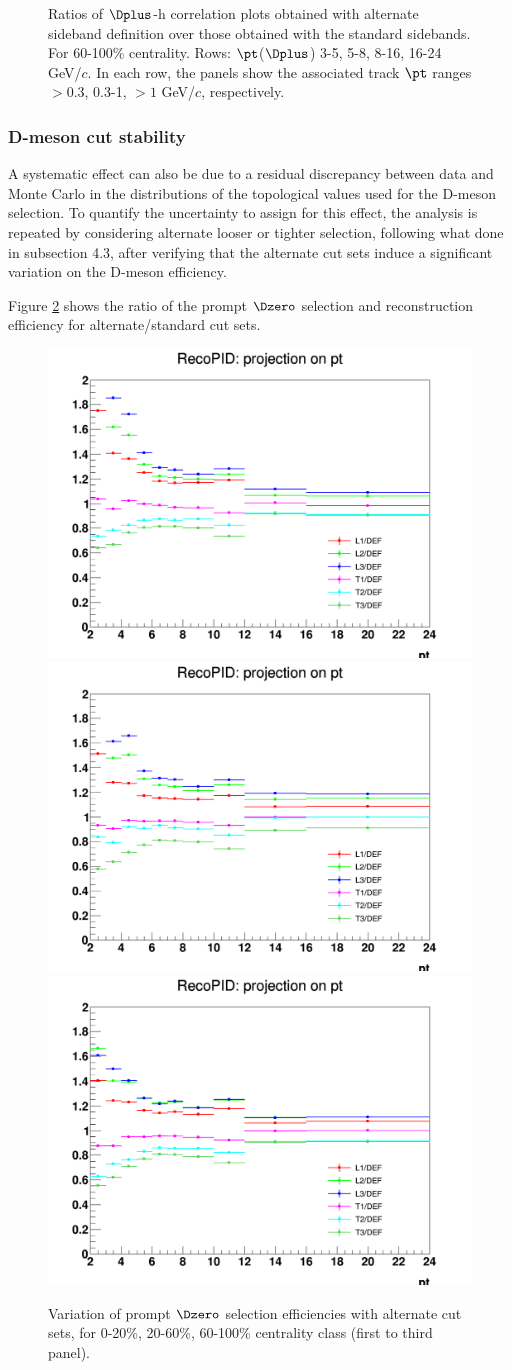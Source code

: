 \begin{figure}
 \caption{Ratios of $\Dplus$-h correlation plots obtained with alternate sideband definition over those obtained with the standard sidebands. For 60-100\% centrality. Rows: $\pt$($\Dplus$) 3-5, 5-8, 8-16, 16-24 GeV/$c$. In each row, the panels show the associated track $\pt$ ranges $> 0.3$, 0.3-1, $> 1$ GeV/$c$, respectively.}
\label{fig:SysBkg60100_Dplus}
\end{figure}

\subsubsection{D-meson cut stability}
A systematic effect can also be due to a residual discrepancy between data and Monte Carlo in the distributions of the topological values used for the D-meson selection. To quantify the uncertainty to assign for this effect, the analysis is repeated by considering alternate looser or tighter selection, following what done in subsection 4.3, after verifying that the alternate cut sets induce a significant variation on the D-meson efficiency.

Figure \ref{fig:EffVariations} shows the ratio of the prompt $\Dzero$ selection and reconstruction efficiency for alternate/standard cut sets.

\begin{figure}
\centering
{\includegraphics[width=0.48\linewidth]{figuresVsCent/Dzero/SystDcuts/CutVarEff_020.png}}
{\includegraphics[width=0.48\linewidth]{figuresVsCent/Dzero/SystDcuts/CutVarEff_2060.png}}
{\includegraphics[width=0.48\linewidth]{figuresVsCent/Dzero/SystDcuts/CutVarEff_60100.png}}
\caption{Variation of prompt $\Dzero$ selection efficiencies with alternate cut sets, for 0-20\%, 20-60\%, 60-100\% centrality class (first to third panel).}
\label{fig:EffVariations}
\end{figure}

